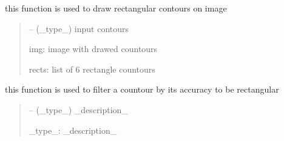 \documentclass[letterpaper,10pt,english]{sphinxmanual}
\begin{document}
\begin{savenotes}
\begin{fulllineitems}
\begin{quote}
\begin{description}
\end{description}\end{quote}

\begin{savenotes}\begin{fulllineitems}
\label{\detokenize{setting/backend/pxvalue_calibration:oxin.backend.pxvalue_calibration.extract_info.draw_rects}}
\pysigstartsignatures
{}
\pysigstopsignatures
\sphinxAtStartPar
this function is used to draw rectangular contours on image
\begin{quote}\begin{description}
\sphinxAtStartPar
{} – (\_type\_) input contours

\sphinxAtStartPar
img: image with drawed countours

\sphinxAtStartPar
rects: list of 6 rectangle countours

\end{description}\end{quote}

\end{fulllineitems}\end{savenotes}


\begin{savenotes}\begin{fulllineitems}
\label{\detokenize{setting/backend/pxvalue_calibration:oxin.backend.pxvalue_calibration.extract_info.filter_acc}}
\pysigstartsignatures
{}
\pysigstopsignatures
\sphinxAtStartPar
this function is used to filter a countour by its accuracy to be rectangular
\begin{quote}\begin{description}
\sphinxAtStartPar
{} – (\_type\_) \_description\_

\sphinxAtStartPar
\_type\_: \_description\_


\end{description}
\end{quote}
\end{fulllineitems}
\end{savenotes}
\end{fulllineitems}
\end{savenotes}
\end{document}
